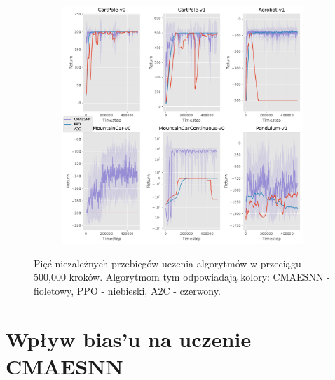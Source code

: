 \documentclass[12pt,a4paper]{article}
\begin{document}
\begin{figure}[ht!]
  \begin{subfigure}[ht!]{0.35\textwidth}
    \includegraphics[width=\textwidth]{../plotting/plots/plot_all4.pdf}
    \caption{}
  \end{subfigure}
  \caption{Pięć niezależnych przebiegów uczenia algorytmów w przeciągu 500,000 kroków.
    Algorytmom tym odpowiadają kolory: CMAESNN - fioletowy, PPO - niebieski,
    A2C - czerwony.}
  \label{}

\end{figure}

\pagebreak
\section{Wpływ bias'u na uczenie CMAESNN}\label{appendix:bias}
\end{document}

